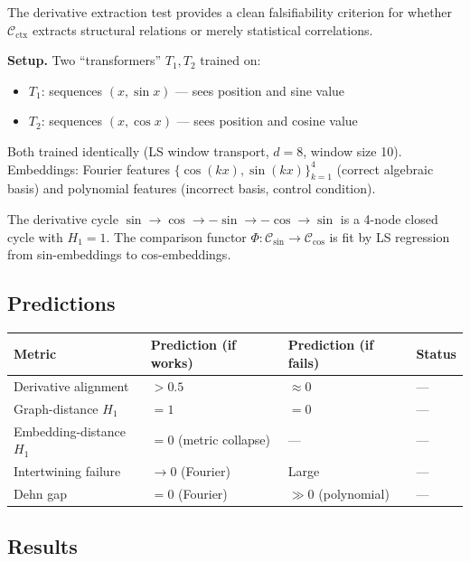 \documentclass[11pt]{amsart}
\theoremstyle{definition}
\newcommand{\Cctx}{\mathcal{C}_{\!\mathrm{ctx}}}
\begin{document}
The derivative extraction test provides a clean falsifiability criterion
for whether $\Cctx$ extracts structural relations or merely statistical correlations.

\textbf{Setup.}
Two ``transformers'' $T_1, T_2$ trained on:
\begin{itemize}
\item $T_1$: sequences $(x, \sin x)$ --- sees position and sine value
\item $T_2$: sequences $(x, \cos x)$ --- sees position and cosine value
\end{itemize}
Both trained identically (LS window transport, $d=8$, window size 10).
Embeddings: Fourier features $\{\cos(kx), \sin(kx)\}_{k=1}^4$ (correct algebraic basis)
and polynomial features (incorrect basis, control condition).

The derivative cycle $\sin \to \cos \to -\sin \to -\cos \to \sin$
is a 4-node closed cycle with $H_1 = 1$.
The comparison functor $\Phi: \mathcal{C}_{\sin} \to \mathcal{C}_{\cos}$
is fit by LS regression from sin-embeddings to cos-embeddings.

\subsection{Predictions}

\begin{center}
\renewcommand{\arraystretch}{1.2}
\begin{tabular}{@{}llll@{}}
\toprule
Metric & Prediction (if works) & Prediction (if fails) & Status \\
\midrule
Derivative alignment & $>0.5$ & $\approx 0$ & --- \\
Graph-distance $H_1$ & $= 1$ & $= 0$ & --- \\
Embedding-distance $H_1$ & $= 0$ (metric collapse) & --- & --- \\
Intertwining failure & $\to 0$ (Fourier) & Large & --- \\
Dehn gap & $= 0$ (Fourier) & $\gg 0$ (polynomial) & --- \\
\bottomrule
\end{tabular}
\end{center}

\subsection{Results}
\end{document}
